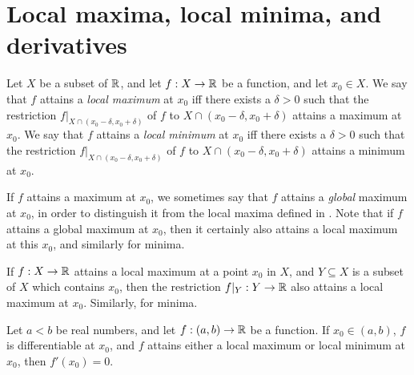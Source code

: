 \section{Local maxima, local minima, and derivatives}\label{i:sec:10.2}

\begin{defn}\label{i:10.2.1}
  Let \(X\) be a subset of \(\mathbb{R}\), and let \(f : X \to \mathbb{R}\) be a function, and let \(x_0 \in X\).
  We say that \(f\) attains a \emph{local maximum} at \(x_0\) iff there exists a \(\delta > 0\) such that the restriction \(f|_{X \cap (x_0 - \delta, x_0 + \delta)}\) of \(f\) to \(X \cap (x_0 - \delta, x_0 + \delta)\) attains a maximum at \(x_0\).
  We say that \(f\) attains a \emph{local minimum} at \(x_0\) iff there exists a \(\delta > 0\) such that the restriction \(f|_{X \cap (x_0 - \delta, x_0 + \delta)}\) of \(f\) to \(X \cap (x_0 - \delta, x_0 + \delta)\) attains a minimum at \(x_0\).
\end{defn}

\begin{rmk}\label{i:10.2.2}
  If \(f\) attains a maximum at \(x_0\), we sometimes say that \(f\) attains a \emph{global} maximum at \(x_0\), in order to distinguish it from the local maxima defined in .
  Note that if \(f\) attains a global maximum at \(x_0\), then it certainly also attains a local maximum at this \(x_0\), and similarly for minima.
\end{rmk}

\setcounter{thm}{4}
\begin{rmk}\label{i:10.2.5}
  If \(f : X \to \mathbb{R}\) attains a local maximum at a point \(x_0\) in \(X\), and \(Y \subseteq X\) is a subset of \(X\) which contains \(x_0\), then the restriction \(f|_Y : Y \to \mathbb{R}\) also attains a local maximum at \(x_0\).
  Similarly, for minima.
\end{rmk}

\begin{prop}\label{i:10.2.6}
  Let \(a < b\) be real numbers, and let \(f : (a, b) \to \mathbb{R}\) be a function.
  If \(x_0 \in (a, b)\), \(f\) is differentiable at \(x_0\), and \(f\) attains either a local maximum or local minimum at \(x_0\), then \(f'(x_0) = 0\).
\end{prop}

